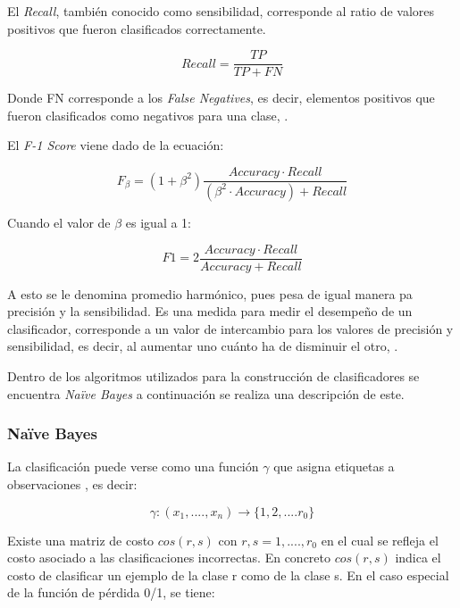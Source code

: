 El \textit{Recall}, también conocido como sensibilidad, corresponde al ratio de valores positivos que fueron clasificados correctamente.

\[
	Recall = \frac{TP}{TP+FN}
\]

Donde FN corresponde a los \textit{False Negatives}, es decir, elementos positivos que fueron clasificados como negativos para una clase, \cite{AccuracyRecall}.

El \textit{F-1 Score} viene dado de la ecuación:

\[
	F_{\beta} = (1+\beta^{2})\frac{Accuracy · Recall}{(\beta^{2} · Accuracy) + Recall}
\]

Cuando el valor de $\beta$ es igual a 1:

\[
	F1 = 2\frac{Accuracy · Recall}{ Accuracy + Recall}
\]

A esto se le denomina promedio harmónico, pues pesa de igual manera pa precisión y la sensibilidad. Es una medida para medir el desempeño de un clasificador, corresponde a un valor de intercambio para los valores de precisión y sensibilidad, es decir, al aumentar uno cuánto ha de disminuir el otro, \cite{FMeasureInterpret}.

Dentro de los algoritmos utilizados para la construcción de clasificadores se encuentra \textit{Naïve Bayes} \cite{NaiveBayes2} a continuación se realiza una descripción de este. 

	\subsubsection*{Naïve Bayes}
	\label{subsubsec:naiveBayes}
	
	La clasificación puede verse como una función \begin{math}\gamma\end{math} que asigna etiquetas a observaciones \cite{NaiveBayes1}, es decir:

	\[\gamma : (x_{1}, .... , x_{n}) \rightarrow \{1, 2, .... r_{0}\} \]

	Existe una matriz de costo \begin{math} cos(r, s)\end{math} con \begin{math} r, s = 1, ...., r_{0}\end{math} en el cual se refleja el costo asociado a las clasificaciones incorrectas. En concreto \begin{math} cos(r, s) \end{math} indica el costo de clasificar un ejemplo de la clase r como de la clase s. En el caso especial de la función de pérdida 0/1, se tiene:

